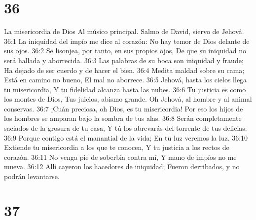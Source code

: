 \chapter{36}

La misericordia de Dios 
Al músico principal. Salmo de David, siervo de Jehová. 

36:1 La iniquidad del impío me dice al corazón: 
No hay temor de Dios delante de sus ojos. 
36:2 Se lisonjea, por tanto, en sus propios ojos, 
De que su iniquidad no será hallada y aborrecida. 
36:3 Las palabras de su boca son iniquidad y fraude; 
Ha dejado de ser cuerdo y de hacer el bien. 
36:4 Medita maldad sobre su cama; 
Está en camino no bueno, 
El mal no aborrece. 
36:5 Jehová, hasta los cielos llega tu misericordia, 
Y tu fidelidad alcanza hasta las nubes. 
36:6 Tu justicia es como los montes de Dios, 
Tus juicios, abismo grande. 
Oh Jehová, al hombre y al animal conservas. 
36:7 ¡Cuán preciosa, oh Dios, es tu misericordia! 
Por eso los hijos de los hombres se amparan bajo la sombra de tus alas. 
36:8 Serán completamente saciados de la grosura de tu casa, 
Y tú los abrevarás del torrente de tus delicias. 
36:9 Porque contigo está el manantial de la vida; 
En tu luz veremos la luz. 
36:10 Extiende tu misericordia a los que te conocen, 
Y tu justicia a los rectos de corazón. 
36:11 No venga pie de soberbia contra mí, 
Y mano de impíos no me mueva. 
36:12 Allí cayeron los hacedores de iniquidad; 
Fueron derribados, y no podrán levantarse. 

\chapter{37}

